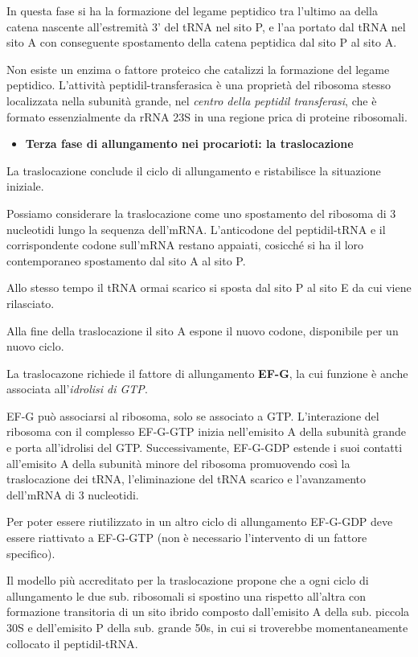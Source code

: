 \documentclass[11pt]{book}
\begin{document}
In questa fase si ha la formazione del legame peptidico tra l'ultimo aa
della catena nascente all'estremità 3' del tRNA nel sito P, e l'aa
portato dal tRNA nel sito A con conseguente spostamento della catena
peptidica dal sito P al sito A.

Non esiste un enzima o fattore proteico che catalizzi la formazione del
legame peptidico. L'attività peptidil-transferasica è una proprietà del
ribosoma stesso localizzata nella subunità grande, nel \emph{centro
della peptidil transferasi}, che è formato essenzialmente da rRNA 23S
in una regione prica di proteine ribosomali.

\begin{itemize}
\itemsep1pt\parskip0pt
\item
  \textbf{Terza fase di allungamento nei procarioti: la traslocazione}
\end{itemize}

La traslocazione conclude il ciclo di allungamento e ristabilisce la
situazione iniziale.

Possiamo considerare la traslocazione come uno spostamento del ribosoma
di 3 nucleotidi lungo la sequenza dell'mRNA. L'anticodone del
peptidil-tRNA e il corrispondente codone sull'mRNA restano appaiati,
cosicché si ha il loro contemporaneo spostamento dal sito A al sito P.

Allo stesso tempo il tRNA ormai scarico si sposta dal sito P al sito E
da cui viene rilasciato.

Alla fine della traslocazione il sito A espone il nuovo codone,
disponibile per un nuovo ciclo.

La traslocazone richiede il fattore di allungamento \textbf{EF-G}, la
cui funzione è anche associata all'\emph{idrolisi di GTP}.

EF-G può associarsi al ribosoma, solo se associato a GTP. L'interazione
del ribosoma con il complesso EF-G-GTP inizia nell'emisito A della
subunità grande e porta all'idrolisi del GTP. Successivamente, EF-G-GDP
estende i suoi contatti all'emisito A della subunità minore del ribosoma
promuovendo così la traslocazione dei tRNA, l'eliminazione del tRNA
scarico e l'avanzamento dell'mRNA di 3 nucleotidi.

Per poter essere riutilizzato in un altro ciclo di allungamento EF-G-GDP
deve essere riattivato a EF-G-GTP (non è necessario l'intervento di un
fattore specifico).

Il modello più accreditato per la traslocazione propone che a ogni ciclo
di allungamento le due sub. ribosomali si spostino una rispetto
all'altra con formazione transitoria di un sito ibrido composto
dall'emisito A della sub. piccola 30S e dell'emisito P della sub. grande
50s, in cui si troverebbe momentaneamente collocato il peptidil-tRNA.
\end{document}
